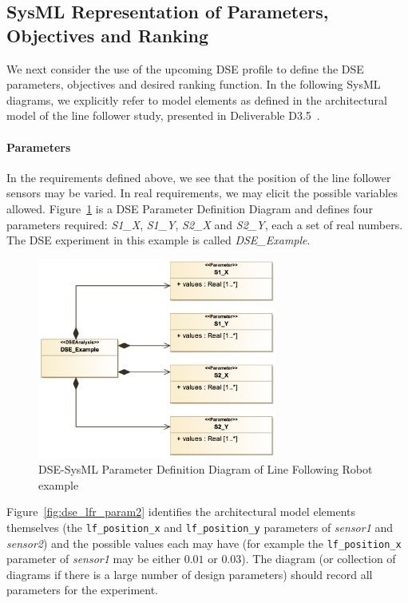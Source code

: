 \subsection{SysML Representation of Parameters, Objectives and Ranking}

We next consider the use of the upcoming DSE profile to define the DSE parameters, objectives and desired ranking function. In the following SysML diagrams, we explicitly refer to model elements as defined in the architectural model of the line follower study, presented in Deliverable D3.5~\cite{INTOCPSD3.5}.

\paragraph{Parameters}   In the requirements defined above, we see that the position of the line follower sensors may be varied. In real requirements, we may elicit the possible variables allowed. Figure~\ref{fig:dse_lfr_param} is a DSE Parameter Definition Diagram and defines four parameters required: \emph{S1\_X}, \emph{S1\_Y}, \emph{S2\_X} and \emph{S2\_Y}, each a set of real numbers.  The DSE experiment in this example is called \emph{DSE\_Example}.

\begin{figure}[htbp]
	\centering
	\includegraphics[width=0.7\textwidth]{figures/LFR_DSE_Param}
\caption{DSE-SysML Parameter Definition Diagram of Line Following Robot example}
\label{fig:dse_lfr_param}
\end{figure}

Figure~\ref{fig:dse_lfr_param2} identifies the architectural model elements themselves (the \texttt{lf\_position\_x} and  \texttt{lf\_position\_y} parameters of \emph{sensor1} and  \emph{sensor2}) and the possible values each may have (for example the \texttt{lf\_position\_x} parameter of \emph{sensor1} may be either $0.01$ or $0.03$). The diagram (or collection of diagrams if there is a large number of design parameters) should record all parameters for the experiment.

